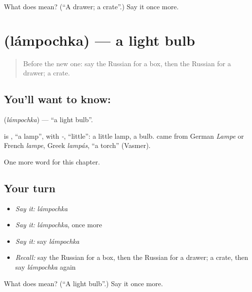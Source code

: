 \begin{tcolorbox}[breakable,colback=teal!4,colframe=teal!35!black,title={Before you move on}]
What does  mean? (\textquotedblleft{}A drawer; a crate\textquotedblright{}.) Say it once more.
\end{tcolorbox}
\section[\texorpdfstring{\ru{лампочка} (lámpochka)}{лампочка (lámpochka)}]{ (lámpochka) — a light bulb}

\label{lesson:RU-C160-lampochka}



\begin{quote}
Before the new one: say the Russian for a box, then the Russian for a drawer; a crate.
\end{quote}

\subsection*{You'll want to know: }
\textbf{} (\emph{lámpochka}) — \textquotedblleft{}a light bulb\textquotedblright{}.

\begin{cousinweb}
\textbf{} is \emph{}, \textquotedblleft{}a lamp\textquotedblright{}, with \emph{-}, \textquotedblleft{}little\textquotedblright{}: a little lamp, a bulb. \emph{} came from German \emph{Lampe} or French \emph{lampe}, Greek \emph{lampás}, \textquotedblleft{}a torch\textquotedblright{} (Vasmer).
\end{cousinweb}

\begin{grammarlens}[title={What you've built}]
One more word for this chapter.
\end{grammarlens}

\subsection*{Your turn}
\begin{itemize}
\raggedright
  \item \emph{Say it:} \emph{lámpochka}
  \item \emph{Say it:} \emph{lámpochka}, once more
  \item \emph{Say it:} say \emph{lámpochka}
  \item \emph{Recall:} say the Russian for a box, then the Russian for a drawer; a crate, then say \emph{lámpochka} again
\end{itemize}

\begin{tcolorbox}[breakable,colback=teal!4,colframe=teal!35!black,title={Before you move on}]
What does  mean? (\textquotedblleft{}A light bulb\textquotedblright{}.) Say it once more.
\end{tcolorbox}

